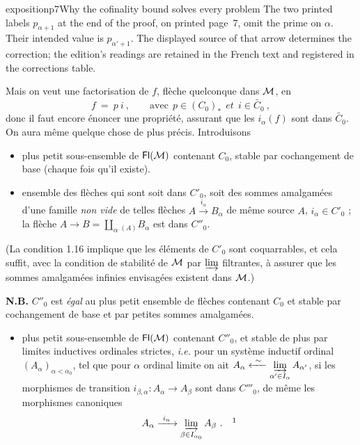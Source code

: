 \begin{dcomment}{exposition}{p7}{Why the cofinality bound solves every problem}
The two printed labels $p_{\alpha+1}$ at the end of the proof, on printed page~7, omit the prime on $\alpha$. Their intended value is $p_{\alpha'+1}$. The displayed source of that arrow determines the correction; the edition's readings are retained in the French text and registered in the corrections table.
\end{dcomment}


Mais on veut une factorisation de $f$, flèche quelconque dans $\mathcal{M}$, en
\[
f \ = \ p\ i \ , \qquad \text{avec} \ \ p \in (C_0)_* \ \ \textit{et} \ \ i \in \widetilde{C_0} \ ,
\]
donc il faut encore énoncer une propriété, assurant que les $i_\alpha(f)$ sont dans $\widetilde{C_0}$. On aura même quelque chose de plus précis. Introduisons

\begin{itemize}[leftmargin=10em, labelwidth=9em, labelsep=1em, align=left]
\item[(1.18)\hfill $C'_0 \ = $] plus petit sous-ensemble de $\mathsf{Fl}(\mathcal{M})$ contenant $C_0$, stable par cochangement de base (chaque fois qu'il existe).
\item[\hfill $C''_0 \ = $] ensemble des flèches qui sont soit dans $C'_0$, soit des sommes amalgamées d'une famille \textit{non vide} de telles flèches $A \xrightarrow{i_\alpha} B_\alpha$ de même source $A$, $i_\alpha \in C'_0$ ; la flèche $A \longrightarrow B = \displaystyle\coprod_{\alpha}{}_{(A)} B_\alpha$ est dans $C''_0$.
\end{itemize}

(La condition 1.16 implique que les éléments de $C'_0$ sont coquarrables, et cela suffit, avec la condition de stabilité de $\mathcal{M}$ par $\varinjlim$ filtrantes, à assurer que les sommes amalgamées infinies envisagées existent dans $\mathcal{M}$.)

\textbf{N.B.} $C''_0$ est \textit{égal} au plus petit ensemble de flèches contenant $C_0$ et stable par cochangement de base et par petites sommes amalgamées.

\setcounter{footnote}{1}%
\begin{itemize}[leftmargin=10em, labelwidth=9em, labelsep=1em, align=left]
\item[(1.19)\hfill $C'''_0 \ = $] plus petit sous-ensemble de $\mathsf{Fl}(\mathcal{M})$ contenant $C''_0$, et stable de plus par limites inductives ordinales strictes, \textit{i.e.} pour un système inductif ordinal $(A_\alpha)_{\alpha<\alpha_0}$, tel que pour $\alpha$ ordinal limite on ait $A_\alpha \xleftarrow{\ \sim\ } \varinjlim\limits_{\alpha' \in I_\alpha} A_{\alpha'}$, si les morphismes de transition $i_{\beta,\alpha} : A_\alpha \longrightarrow A_\beta$ sont dans $C'''_0$, de même les morphismes canoniques
\[
A_\alpha \xrightarrow{\ i_\alpha\ } \varinjlim_{\beta \in I_{\alpha_0}} A_\beta \ . \quad \footnotemark
\]
\end{itemize}

